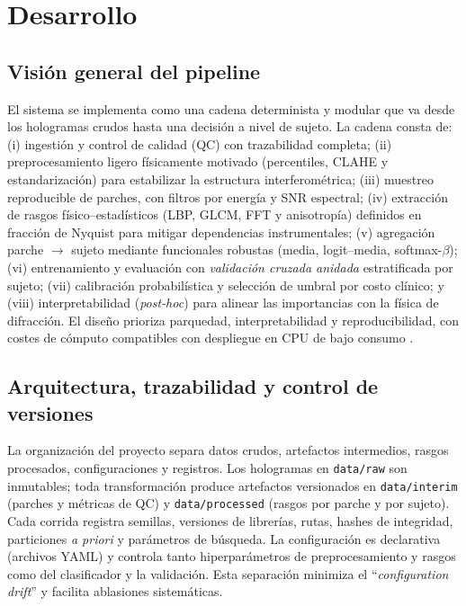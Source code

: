 \chapter{Desarrollo}
\label{chap:desarrollo}

\section*{Visión general del pipeline}
El sistema se implementa como una cadena determinista y modular que va desde los hologramas crudos hasta una decisión a nivel de sujeto. La cadena consta de: (i) ingestión y control de calidad (QC) con trazabilidad completa; (ii) preprocesamiento ligero físicamente motivado (percentiles, CLAHE y estandarización) para estabilizar la estructura interferométrica; (iii) muestreo reproducible de parches, con filtros por energía y SNR espectral; (iv) extracción de rasgos físico–estadísticos (LBP, GLCM, FFT y anisotropía) definidos en fracción de Nyquist para mitigar dependencias instrumentales; (v) agregación parche $\rightarrow$ sujeto mediante funcionales robustas (media, logit–media, softmax-$\beta$); (vi) entrenamiento y evaluación con \emph{validación cruzada anidada} estratificada por sujeto; (vii) calibración probabilística y selección de umbral por costo clínico; y (viii) interpretabilidad (\emph{post-hoc}) para alinear las importancias con la física de difracción. El diseño prioriza parquedad, interpretabilidad y reproducibilidad, con costes de cómputo compatibles con despliegue en CPU de bajo consumo \cite{Chen2022Photonics,Greenbaum2014STM,Tsamardinos2022Patterns}.

\section*{Arquitectura, trazabilidad y control de versiones}
La organización del proyecto separa datos crudos, artefactos intermedios, rasgos procesados, configuraciones y registros. Los hologramas en \texttt{data/raw} son inmutables; toda transformación produce artefactos versionados en \texttt{data/interim} (parches y métricas de QC) y \texttt{data/processed} (rasgos por parche y por sujeto). Cada corrida registra semillas, versiones de librerías, rutas, hashes de integridad, particiones \emph{a priori} y parámetros de búsqueda. La configuración es declarativa (archivos YAML) y controla tanto hiperparámetros de preprocesamiento y rasgos como del clasificador y la validación. Esta separación minimiza el ``\emph{configuration drift}'' y facilita ablasiones sistemáticas.

